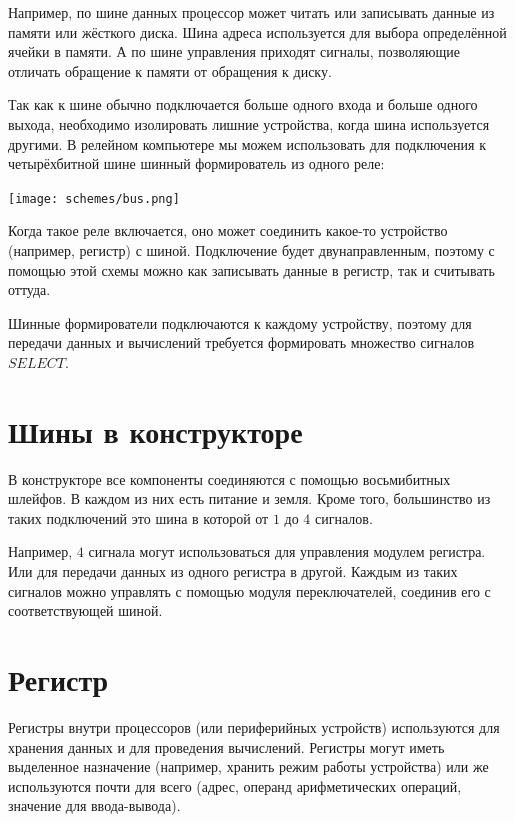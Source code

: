 Например, по шине данных процессор может читать или записывать данные из памяти
или жёсткого диска. Шина адреса используется для выбора определённой ячейки в памяти.
А по шине управления приходят сигналы, позволяющие отличать обращение к памяти
от обращения к диску.

Так как к шине обычно подключается больше одного входа и больше одного выхода,
необходимо изолировать лишние устройства, когда шина используется другими.
В релейном компьютере мы можем использовать для подключения к четырёхбитной шине
шинный формирователь из одного реле:

\begin{center}
\texttt{[image: schemes/bus.png]}
\end{center}

Когда такое реле включается, оно может соединить какое-то устройство (например, регистр)
с шиной. Подключение будет двунаправленным, поэтому с помощью этой схемы можно как
записывать данные в регистр, так и считывать оттуда.

Шинные формирователи подключаются к каждому устройству, поэтому
для передачи данных и вычислений требуется формировать множество сигналов $SELECT$.

\section{Шины в конструкторе}

В конструкторе все компоненты соединяются с помощью восьмибитных шлейфов.
В каждом из них есть питание и земля. Кроме того, большинство из таких
подключений это шина в которой от $1$ до $4$ сигналов.

Например, $4$ сигнала могут использоваться для управления модулем регистра.
Или для передачи данных из одного регистра в другой.
Каждым из таких сигналов можно управлять с помощью модуля переключателей,
соединив его с соответствующей шиной.

\section{Регистр}

Регистры внутри процессоров (или периферийных устройств)
используются для хранения данных и для проведения вычислений.
Регистры могут иметь выделенное назначение (например, хранить режим работы устройства)
или же используются почти для всего (адрес, операнд арифметических операций,
значение для ввода-вывода).

